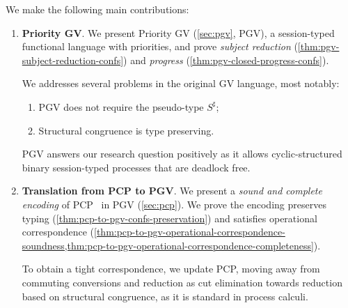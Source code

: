 We make the following main contributions:
\begin{enumerate}
\item \textbf{Priority GV}. We present Priority GV (\cref{sec:pgv}, PGV), a session-typed functional language with priorities, and prove \emph{subject reduction} (\cref{thm:pgv-subject-reduction-confs}) and \emph{progress} (\cref{thm:pgv-closed-progress-confs}).

We addresses several problems in the original GV language, most notably:
  \begin{enumerate}
  \item PGV does not require the pseudo-type $S^\sharp$;
  \item Structural congruence is type preserving.
  \end{enumerate}
  PGV answers our research question positively as it allows cyclic-structured binary session-typed processes that are deadlock free.
\item \textbf{Translation from PCP to PGV}.
  We present a \emph{sound and complete encoding} of PCP~\cite{dardhagay18extended} in PGV (\cref{sec:pcp}). We prove the encoding preserves typing (\cref{thm:pcp-to-pgv-confs-preservation}) and satisfies operational correspondence (\cref{thm:pcp-to-pgv-operational-correspondence-soundness,thm:pcp-to-pgv-operational-correspondence-completeness}).
  
  To obtain a tight correspondence, we update PCP, moving away from commuting conversions and reduction as cut elimination towards reduction based on structural congruence, as it is standard in process calculi.
\end{enumerate}
